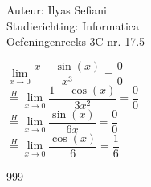 \documentclass[a4paper]{article}
\newcommand{\llim}{\lim\limits}
\begin{document}
\noindent \large Auteur: Ilyas Sefiani \\
\noindent \large Studierichting: Informatica\\
\noindent \large Oefeningenreeks 3C nr. 17.5\\

\medskip

\normalsize

$\llim_{x \rightarrow 0} \dfrac{x-\sin(x)}{x^3} = \dfrac{0}{0}$\\

$\overset{H}{=}\llim_{x \rightarrow 0} \dfrac{1-\cos(x)}{3x^2} = \dfrac{0}{0}$\\

$\overset{H}{=}\llim_{x \rightarrow 0} \dfrac{\sin(x)}{6x} = \dfrac{0}{0}$\\ 

$\overset{H}{=}\llim_{x \rightarrow 0} \dfrac{\cos(x)}{6} = \dfrac{1}{6}$\\ 

\begin{thebibliography}{999}
\end{thebibliography}
\end{document}
